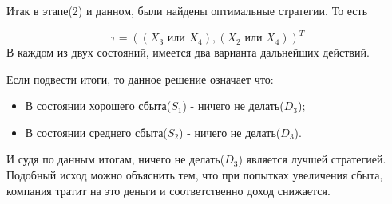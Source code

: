 Итак в этапе(2) и данном, были найдены оптимальные стратегии. То есть

\begin{equation*}
\tau=((X_3 \textit{ или } X_4), (X_2 \textit{ или } X_4))^T
\end{equation*}
В каждом из двух состояний, имеется два варианта дальнейших действий.

Если подвести итоги, то данное решение означает что:
\begin{itemize}
\item В состоянии хорошего сбыта($S_1$) - ничего не делать($D_3$);
\item В состоянии среднего сбыта($S_2$) - ничего не делать($D_3$).
\end{itemize}
И судя по данным итогам, ничего не делать($D_3$) является лучшей стратегией. Подобный исход можно объяснить тем, что при попытках увеличения сбыта, компания тратит на это деньги и соответственно доход снижается.


